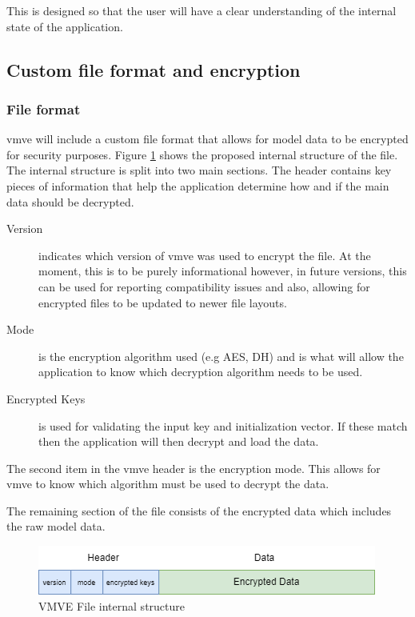 \documentclass[11pt]{article}
\begin{document}
This is designed so that the user will have a clear understanding of the internal state
of the application.

\subsection{Custom file format and encryption}

\subsubsection{File format}
\gls*{vmve} will include a custom file format that allows for model data to be
encrypted for security purposes. Figure \ref{fig:vmve_file_structure} shows the
proposed internal structure of the file. The internal structure is split into
two main sections. The header contains key pieces of information that help the
application determine how and if the main data should be decrypted.

\begin{description}
  \item[Version] indicates which version of \gls*{vmve} was used to encrypt the
  file. At the moment, this is to be purely informational however, in future
  versions, this can be used for reporting compatibility issues and also,
  allowing for encrypted files to be updated to newer file layouts.
  \item[Mode] is the encryption algorithm used (e.g AES, DH) and is what will
  allow the application to know which decryption algorithm needs to be used.
  \item[Encrypted Keys] is used for validating the input key and initialization
  vector. If these match then the application will then decrypt and load the data.
\end{description}

The second item in the \gls*{vmve} header is the encryption mode. This allows for
\gls*{vmve} to know which algorithm must be used to decrypt the data.

The remaining section of the file consists of the encrypted data which includes
the raw model data.

\begin{figure}[H]
  \centering
  \includegraphics[width=\textwidth]{images/vmve_file_structure.png}
  \caption{VMVE File internal structure}
  \label{fig:vmve_file_structure}
\end{figure}
\end{document}
